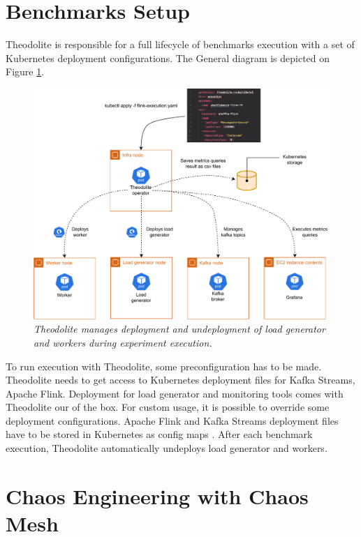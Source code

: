 \section{Benchmarks Setup}\label{sec:benchamrks-setup}
Theodolite is responsible for a full lifecycle of benchmarks execution with
a set of Kubernetes deployment configurations.
The General diagram is depicted on Figure \ref{fig:theodolite-process}.

\begin{figure}[ht]
    \centering
    \includegraphics[width=1\textwidth]{figures/theodolite-process}
    \caption{\textit{Theodolite manages deployment and undeployment of load generator and workers during experiment execution.}}
    \label{fig:theodolite-process}
\end{figure}

To run execution with Theodolite, some preconfiguration has to be made.
Theodolite needs to get access to Kubernetes deployment files for Kafka Streams,
Apache Flink.
Deployment for load generator and monitoring tools comes with Theodolite our of the box.
For custom usage, it is possible to override some deployment configurations.
Apache Flink and Kafka Streams deployment files have to be stored in Kubernetes as config maps \cite{kubernetesConfigMap}.
After each benchmark execution, Theodolite automatically undeploys load generator and workers.


\section{Chaos Engineering with Chaos Mesh}\label{sec:chaos-mesh}

